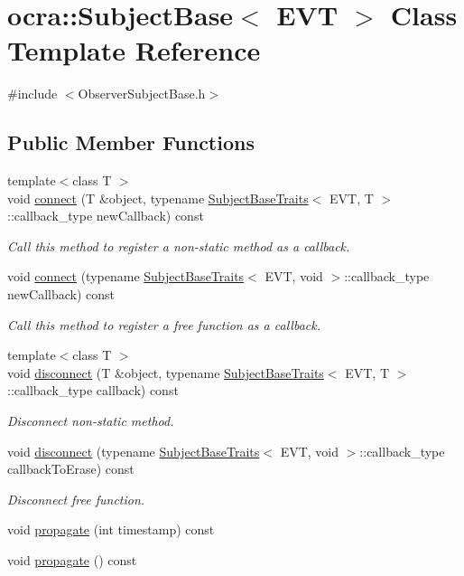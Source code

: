 \hypertarget{classocra_1_1SubjectBase}{}\section{ocra\+:\+:Subject\+Base$<$ E\+VT $>$ Class Template Reference}
\label{classocra_1_1SubjectBase}


{\ttfamily \#include $<$Observer\+Subject\+Base.\+h$>$}

\subsection*{Public Member Functions}
\begin{DoxyCompactItemize}
\item 
{\footnotesize template$<$class T $>$ }\\void \hyperlink{classocra_1_1SubjectBase_a3f0e6104fbce76bb404baf26f492abe1}{connect} (T \&object, typename \hyperlink{structocra_1_1SubjectBaseTraits}{Subject\+Base\+Traits}$<$ E\+VT, T $>$\+::callback\+\_\+type new\+Callback) const
\begin{DoxyCompactList}\small\item\em Call this method to register a non-\/static method as a callback. \end{DoxyCompactList}\item 
void \hyperlink{classocra_1_1SubjectBase_ab55ed9994f531d0e27eda42b1dc29488}{connect} (typename \hyperlink{structocra_1_1SubjectBaseTraits}{Subject\+Base\+Traits}$<$ E\+VT, void $>$\+::callback\+\_\+type new\+Callback) const
\begin{DoxyCompactList}\small\item\em Call this method to register a free function as a callback. \end{DoxyCompactList}\item 
{\footnotesize template$<$class T $>$ }\\void \hyperlink{classocra_1_1SubjectBase_af3b55ac17510d71839935a8ab15b1956}{disconnect} (T \&object, typename \hyperlink{structocra_1_1SubjectBaseTraits}{Subject\+Base\+Traits}$<$ E\+VT, T $>$\+::callback\+\_\+type callback) const
\begin{DoxyCompactList}\small\item\em Disconnect non-\/static method. \end{DoxyCompactList}\item 
void \hyperlink{classocra_1_1SubjectBase_a58cd908830894df5c5cc6d03888ae8cc}{disconnect} (typename \hyperlink{structocra_1_1SubjectBaseTraits}{Subject\+Base\+Traits}$<$ E\+VT, void $>$\+::callback\+\_\+type callback\+To\+Erase) const
\begin{DoxyCompactList}\small\item\em Disconnect free function. \end{DoxyCompactList}\item 
void \hyperlink{classocra_1_1SubjectBase_aed2d8628df9c04ae95ce8ca68ff75819}{propagate} (int timestamp) const
\item 
void \hyperlink{classocra_1_1SubjectBase_ac1ea6ef128938185c89519913da5b063}{propagate} () const
\end{DoxyCompactItemize}
